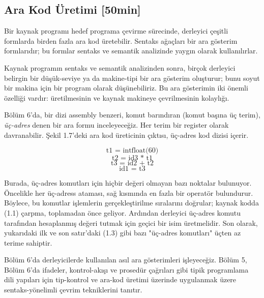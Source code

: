 \subsection{Ara Kod Üretimi [50min]}
Bir kaynak programı hedef programa çevirme sürecinde, derleyici çeşitli formlarda birden fazla ara kod üretebilir. Sentaks ağaçları bir ara gösterim formlarıdır; bu formlar sentaks ve semantik analizinde yaygın olarak kullanılırlar.

Kaynak programın sentaks ve semantik analizinden sonra, birçok derleyici belirgin bir düşük-seviye ya da makine-tipi bir ara gösterim oluşturur; bunu soyut bir makina için bir program olarak düşünebiliriz. Bu ara gösterimin iki önemli özelliği vardır: üretilmesinin ve kaynak makineye çevrilmesinin kolaylığı.

Bölüm 6'da, bir dizi assembly benzeri, komut barındıran (komut başına üç terim), \textit{üç-adres} denen bir ara formu inceleyeceğiz. Her terim bir register olarak davranabilir. Şekil 1.7'deki ara kod üreticinin çıktısı, üç-adres kod dizisi içerir.

\begin{equation*}
\text{ t1 = intfloat(60) }
\end{equation*}
\begin{equation*}
\text{ t2 = id3 * t1 }
\end{equation*}
\begin{equation}
\text{ t3 = id2 + t2 }
\end{equation}
\begin{equation*}
\text{ id1 = t3 }
\end{equation*}

Burada, üç-adres komutları için hiçbir değeri olmayan bazı noktalar bulunuyor. Öncelikle her üç-adress ataması, sağ kısmında en fazla bir operatör bulundurur. Böylece, bu komutlar işlemlerin gerçekleştirilme sıralarını doğrular; kaynak kodda (1.1) çarpma, toplamadan önce geliyor. Ardından derleyici üç-adres komutu tarafından hesaplanmış değeri tutmak için geçici bir isim üretmelidir. Son olarak, yukarıdaki ilk ve son satır'daki (1.3) gibi bazı "üç-adres komutları" üçten az terime sahiptir.

Bölüm 6'da derleyicilerde kullanılan asıl ara gösterimleri işleyeceğiz. Bölüm 5, Bölüm 6'da ifadeler, kontrol-akışı ve prosedür çağrıları gibi tipik programlama dili yapıları için tip-kontrol ve ara-kod üretimi üzerinde uygulanmak üzere sentaks-yönelimli çevrim tekniklerini tanıtır.


